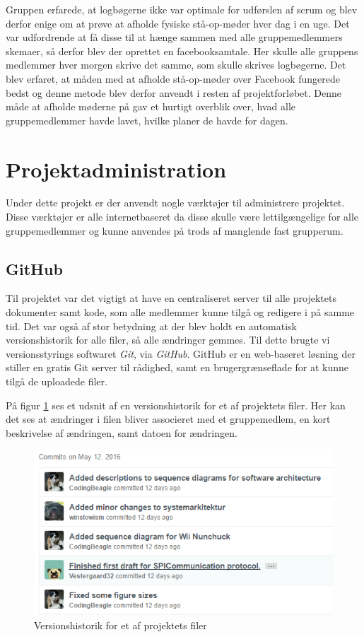 Gruppen erfarede, at logbøgerne ikke var optimale for udførslen af scrum og blev derfor enige om at prøve at afholde fysiske stå-op-møder hver dag i en uge. Det var udfordrende at få disse til at hænge sammen med alle gruppemedlemmers skemaer, så derfor blev der oprettet en facebooksamtale. Her skulle alle gruppens medlemmer hver morgen skrive det samme, som skulle skrives logbøgerne. Det blev erfaret, at måden med at afholde stå-op-møder over Facebook fungerede bedst og denne metode blev derfor anvendt i resten af projektforløbet. Denne måde at afholde møderne på gav et hurtigt overblik over, hvad alle gruppemedlemmer havde lavet, hvilke planer de havde for dagen. 

\section{Projektadministration}
Under dette projekt er der anvendt nogle værktøjer til administrere projektet. Disse værktøjer er alle internetbaseret da disse skulle være lettilgængelige for alle gruppemedlemmer og kunne anvendes på trods af manglende fast grupperum.

\subsection{GitHub}
Til projektet var det vigtigt at have en centraliseret server til alle projektets dokumenter samt kode, som alle medlemmer kunne tilgå og redigere i på samme tid. Det var også af stor betydning at der blev holdt en automatisk versionshistorik for alle filer, så alle ændringer gemmes. Til dette brugte vi versionsstyrings softwaret \textit{Git}, via \textit{GitHub}. GitHub er en web-baseret løsning der stiller en gratis Git server til rådighed, samt en brugergrænseflade for at kunne tilgå de uploadede filer. \newline

\noindent På figur \ref{ref:GitHubHistorik} ses et udsnit af en versionshistorik for et af projektets filer. Her kan det ses at ændringer i filen bliver associeret med et gruppemedlem, en kort beskrivelse af ændringen, samt datoen for ændringen.

\begin{figure}[H]
	\centering
	\includegraphics[width=\textwidth]{Projektgennemfoerelse/images/GitHubHistorik}
	\caption{Versionshistorik for et af projektets filer}
	\label{ref:GitHubHistorik}
\end{figure}

